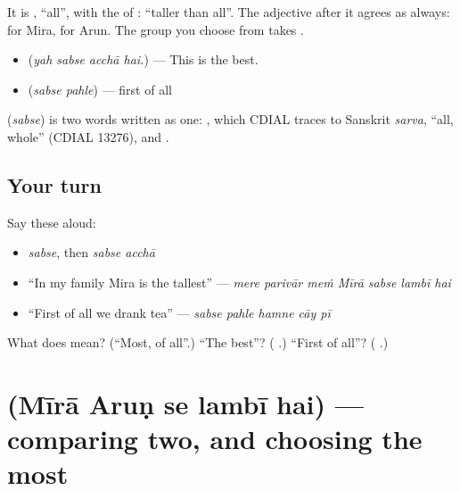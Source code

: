 It is \textbf{}, \textquotedblleft{}all\textquotedblright{}, with the \textbf{} of \textbf{  }: \textquotedblleft{}taller than all\textquotedblright{}. The adjective after it agrees as always: \textbf{ } for Mira, \textbf{ } for Arun. The group you choose from takes \textbf{}.

\begin{itemize}
\raggedright
  \item \textbf{   } (\emph{yah sabse acchā hai.}) — This is the best.
  \item \textbf{ } (\emph{sabse pahle}) — first of all
\end{itemize}

\begin{cousinweb}
\textbf{} (\emph{sabse}) is two words written as one: \textbf{}, which CDIAL traces to Sanskrit \emph{sarva}, \textquotedblleft{}all, whole\textquotedblright{} (CDIAL 13276), and \textbf{}.
\end{cousinweb}

\subsection*{Your turn}
Say these aloud:

\begin{itemize}
\raggedright
  \item \emph{sabse}, then \emph{sabse acchā}
  \item \textquotedblleft{}In my family Mira is the tallest\textquotedblright{} — \emph{mere parivār meṁ Mīrā sabse lambī hai}
  \item \textquotedblleft{}First of all we drank tea\textquotedblright{} — \emph{sabse pahle hamne cāy pī}
\end{itemize}

\begin{tcolorbox}[breakable,colback=teal!4,colframe=teal!35!black,title={Before you move on}]
What does \textbf{} mean? (\textquotedblleft{}Most, of all\textquotedblright{}.) \textquotedblleft{}The best\textquotedblright{}? (\textbf{ }.) \textquotedblleft{}First of all\textquotedblright{}? (\textbf{ }.)
\end{tcolorbox}
\section[\texorpdfstring{\hi{मीरा} \hi{अरुण} \hi{से} \hi{लंबी} \hi{है} (Mīrā Aruṇ se …)}{मीरा अरुण से लंबी है (Mīrā Aruṇ se …)}]{     (Mīrā Aruṇ se lambī hai) — comparing two, and choosing the most}

